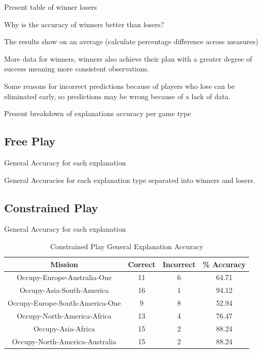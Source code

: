 \documentclass[parskip]{cs4rep}
\begin{document}
Present table of winner losers

Why is the accuracy of winners better than losers?

The results show on an average (calculate percentage difference across measures)

More data for winners, winners also achieve their plan with a greater degree of success meaning more consistent observations.

Some reasons for incorrect predictions because of players who lose can be eliminated early, so predictions may be wrong because of a lack of data.

Present breakdown of explanations accuracy per game type

\subsection{Free Play}

General Accuracy for each explanation

General Accuracies for each explanation type separated into winners and losers.

\newpage

\subsection{Constrained Play}

General Accuracy for each explanation

\begin{table}[ht]
\centering
\begin{tabular}{|c|c|c|c|}
\hline 
\textbf{Mission} & \textbf{Correct} & \textbf{Incorrect} & \textbf{\% Accuracy} \\ 
\hline 
Occupy-Europe-Australia-One & 11 & 6 & 64.71 \\  
\hline 
Occupy-Asia-South-America & 16 & 1 & 94.12 \\ 
\hline
Occupy-Europe-South-America-One & 9 & 8 & 52.94 \\
\hline
Occupy-North-America-Africa & 13 & 4 & 76.47 \\
\hline
Occupy-Asia-Africa & 15 & 2 & 88.24 \\
\hline
Occupy-North-America-Australia & 15 & 2 & 88.24 \\
\hline
\end{tabular}
\caption{Constrained Play General Explanation Accuracy}
\label{table:continent-bonus}
\end{table}
\end{document}
